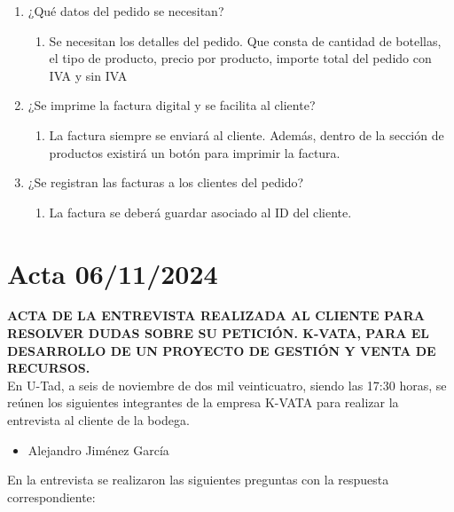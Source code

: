 \begin{enumerate}
    \item ¿Qué datos del pedido se necesitan?
    \begin{enumerate}
        \item Se necesitan los detalles del pedido. Que consta de cantidad de botellas, el tipo de producto, precio por producto, importe total del pedido con IVA y sin IVA
    \end{enumerate}

    \item ¿Se imprime la factura digital y se facilita al cliente?
    \begin{enumerate}
        \item La factura siempre se enviará al cliente. Además, dentro de la sección de productos existirá un botón para imprimir la factura.
    \end{enumerate}

    \item ¿Se registran las facturas a los clientes del pedido?
    \begin{enumerate}
        \item La factura se deberá guardar asociado al ID del cliente.
    \end{enumerate}
\end{enumerate}

\section{Acta 06/11/2024}

\textbf{ACTA DE LA ENTREVISTA REALIZADA AL CLIENTE PARA RESOLVER DUDAS SOBRE SU PETICIÓN. K-VATA, PARA EL DESARROLLO DE UN PROYECTO DE GESTIÓN Y VENTA DE RECURSOS.}\\

En U-Tad, a seis de noviembre de dos mil veinticuatro, siendo las 17:30 horas, se reúnen los siguientes integrantes de la empresa K-VATA para realizar la entrevista al cliente de la bodega.
\begin{itemize}
    \item Alejandro Jiménez García
\end{itemize}

En la entrevista se realizaron las siguientes preguntas con la respuesta correspondiente:

